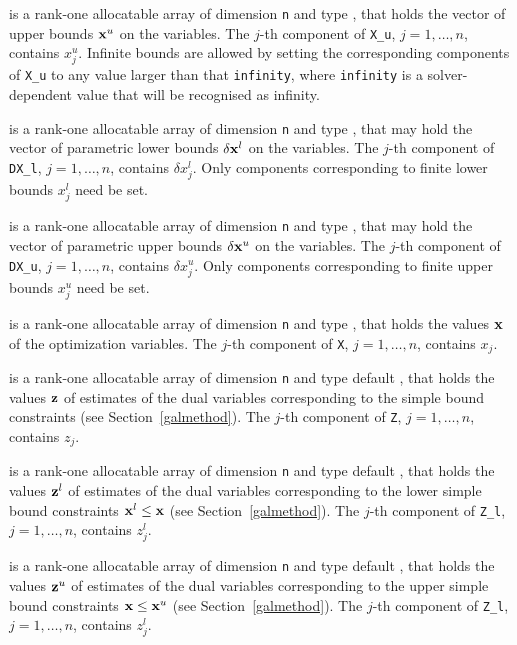 \documentclass{galahad}
\begin{document}
\begin{description}
 is a rank-one allocatable array of dimension {\tt n} and type 
\realdp, that holds
the vector of upper bounds ${\mathbf{x}}^{u}$ on the variables.
The $j$-th component of {\tt X\_u}, $j = 1, \ldots , n$, 
contains $x_{j}^{u}$.
Infinite bounds are allowed by setting the corresponding 
components of {\tt X\_u} to any value larger than that {\tt infinity}, 
where {\tt infinity} is a  solver-dependent value that will be recognised as
infinity.

 is a rank-one allocatable array of dimension {\tt n} and type 
\realdp, that may hold the vector of parametric lower bounds 
$\delta {\mathbf{x}}^{l}$ on the variables. The $j$-th component of 
{\tt DX\_l}, $j = 1, \ldots , n$, contains $\delta x_{j}^{l}$.
Only components corresponding to finite lower bounds $x_{j}^{l}$
need be set.

 is a rank-one allocatable array of dimension {\tt n} and type 
\realdp, that may hold the vector of parametric upper bounds 
$\delta {\mathbf{x}}^{u}$  on the variables. The $j$-th component of 
{\tt DX\_u}, $j = 1,  \ldots ,  n$, contains $\delta x_{j}^{u}$.
Only components corresponding to finite upper bounds $x_{j}^{u}$
need be set.

 is a rank-one allocatable array of dimension {\tt n} and type 
\realdp, 
that holds the values ${\mathbf{x}}$ of the optimization variables.
The $j$-th component of {\tt X}, $j = 1,  \ldots , n$, contains $x_{j}$.  

 is a rank-one allocatable array of dimension {\tt n} and type default 
\realdp, that holds
the values ${\mathbf{z}}$ of estimates  of the dual variables 
corresponding to the simple bound constraints (see Section~\ref{galmethod}).
The $j$-th component of {\tt Z}, $j = 1,  \ldots ,  n$, contains $z_{j}$.  

 is a rank-one allocatable array of dimension {\tt n} and type default 
\realdp, that holds
the values ${\mathbf{z}}^{l}$ of estimates  of the dual variables 
corresponding to the lower simple bound constraints ${\mathbf{x}}^{l} \leq {\mathbf{x}}$
(see Section~\ref{galmethod}).
The $j$-th component of {\tt Z\_l}, $j = 1,  \ldots ,  n$, 
contains $z_{j}^{l}$.  

 is a rank-one allocatable array of dimension {\tt n} and type default 
\realdp, that holds
the values ${\mathbf{z}}^{u}$ of estimates  of the dual variables 
corresponding to the upper simple bound constraints ${\mathbf{x}} \leq {\mathbf{x}}^{u}$
(see Section~\ref{galmethod}).
The $j$-th component of {\tt Z\_l}, $j = 1,  \ldots ,  n$, 
contains $z_{j}^{l}$.  


\end{description}
\end{document}
